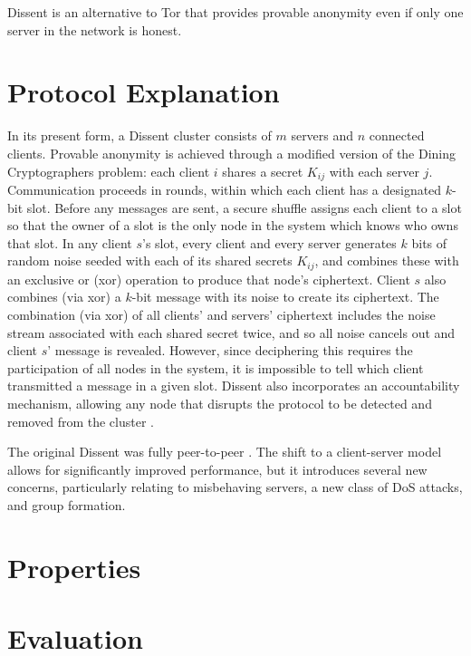   Dissent is an alternative to Tor that provides provable anonymity even if
  only one server in the network is honest\cite{p2pd}.
  \section{Protocol Explanation}
  In its present form, a Dissent cluster consists of $m$ servers and $n$
  connected clients\cite{din}. Provable anonymity is
  achieved through a modified version of the Dining Cryptographers
  problem\cite{chaum_dining_1988}: each client $i$ shares a secret $K_{ij}$
  with each server $j$. Communication proceeds in rounds, within which each
  client has a designated $k$-bit slot.  Before any messages are sent, a
  secure shuffle\cite{neff} assigns each client to a slot so
  that the owner of a slot is the only node in the system which knows who owns
  that slot.  In any client $s$'s slot, every client and every server
  generates $k$ bits of random noise seeded with each of its shared secrets
  $K_{ij}$, and combines these with an exclusive or (xor) operation to produce
  that node's ciphertext. Client $s$ also combines (via xor) a $k$-bit message
  with its noise to create its ciphertext. The combination (via xor) of all
  clients' and servers' ciphertext includes the noise stream associated with
  each shared secret twice, and so all noise cancels out and client $s$'
  message is revealed. However, since deciphering this requires the
  participation of all nodes in the system, it is impossible to tell which
  client transmitted a message in a given slot. Dissent also incorporates an
  accountability mechanism, allowing any node that disrupts the protocol to be
  detected and removed from the cluster
  \cite{verdict}.

  The original Dissent was fully peer-to-peer
  \cite{p2pd}. The shift to a client-server model
  allows for significantly improved performance, but it introduces several new
  concerns, particularly relating to misbehaving servers, a new class of DoS
  attacks, and group formation.

  \section{Properties}
  \section{Evaluation}
